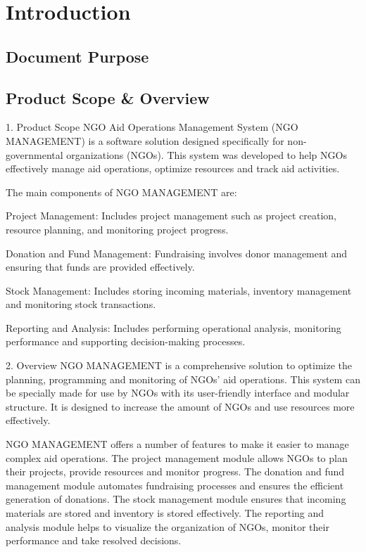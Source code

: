 \documentclass{report}
\begin{document}
	\chapter{Introduction}
		\section{Document Purpose}
		\section{Product Scope \& Overview}
  			1. Product Scope
			NGO Aid Operations Management System (NGO MANAGEMENT) is a software solution designed specifically for non-governmental organizations 			(NGOs). This system was developed to help NGOs effectively manage aid operations, optimize resources and track aid activities.

			The main components of NGO MANAGEMENT are:

			Project Management: Includes project management such as project creation, resource planning, and monitoring project progress.

			Donation and Fund Management: Fundraising involves donor management and ensuring that funds are provided effectively.

			Stock Management: Includes storing incoming materials, inventory management and monitoring stock transactions.

			Reporting and Analysis: Includes performing operational analysis, monitoring performance and supporting decision-making processes.

			2. Overview
			NGO MANAGEMENT is a comprehensive solution to optimize the planning, programming and monitoring of NGOs' aid operations. This system 			can be specially made for use by NGOs with its user-friendly interface and modular structure. It is designed to increase the amount 			of NGOs and use resources more effectively.
			
			NGO MANAGEMENT offers a number of features to make it easier to manage complex aid operations. The project management module allows 			NGOs to plan their projects, provide resources and monitor progress. The donation and fund management module automates fundraising 			processes and ensures the efficient generation of donations. The stock management module ensures that incoming materials are stored 			and inventory is stored effectively. The reporting and analysis module helps to visualize the organization of NGOs, monitor their 			performance and take resolved decisions.
			
\end{document}
